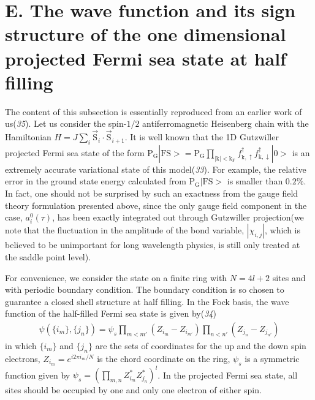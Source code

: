\documentclass[12pt]{article}
\begin{document}
\section*{E. The wave function and its sign structure of the one dimensional projected Fermi sea state at half filling}
The content of this subsection is essentially reproduced from an earlier work of us({\it 35\/}). Let us consider the spin-$1/2$ antiferromagnetic Heisenberg chain with the Hamiltonian $H=J\sum_{i}\vec{\mathrm{S}}_{i}\cdot\vec{\mathrm{S}}_{i+1}$. It is well known that the 1D Gutzwiller projected Fermi sea state of the form $\mathrm{P_{G}}|\mathrm{FS}>=\mathrm{P_{G}}\prod_{\mathrm{|k|<k_{F}}}f^{\dagger}_{\mathrm{k},\uparrow}f^{\dagger}_{\mathrm{k},\downarrow}|0>$ is an extremely accurate variational state of this model({\it 33\/}). For example, the relative error in the ground state energy calculated from  $\mathrm{P_{G}}|\mathrm{FS}>$ is smaller than $0.2\%$.  In fact, one should not be surprised by such an exactness from the gauge field theory formulation presented above, since the only gauge field component in the case, $a^{0}_{i}(\tau)$, has been exactly integrated out through Gutzwiller projection(we note that the fluctuation in the amplitude of the bond variable, $|\chi_{i,j}|$, which is believed to be unimportant for long wavelength physics, is still only treated at the saddle point level). 

For convenience, we consider the state on a finite ring with $N=4l+2$ sites and with periodic boundary condition. The boundary condition is so chosen to guarantee a closed shell structure at half filling. In the Fock basis, the wave function of the half-filled Fermi sea state is given by({\it 34\/})
 \begin{eqnarray}
\psi(\{i_{m}\},\{j_{n}\})=\psi_{s}\prod_{m<m'}(Z_{i_{m}}-Z_{i_{m'}})\prod_{n<n'}(Z_{j_{n}}-Z_{j_{n'}})\nonumber
\end{eqnarray}
in which $\{i_{m}\}$ and $\{j_{n}\}$ are the sets of coordinates for the up and the down spin electrons, $Z_{i_{m}}=e^{i2\pi i_{m}/N}$ is the chord coordinate on the ring,  $\psi_{s}$ is a symmetric function given by $\psi_{s}=(\prod_{m,n}Z^{*}_{i_{m}}Z^{*}_{j_{n}})^{l}$. In the projected Fermi sea state, all sites should be occupied by one and only one electron of either spin.
\end{document}
